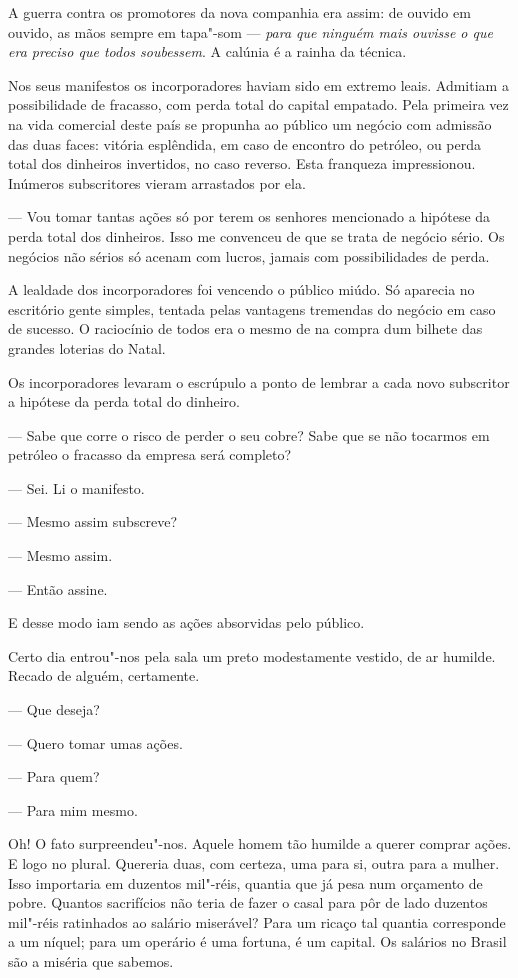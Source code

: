 A guerra contra os promotores da nova companhia era assim: de ouvido em
ouvido, as mãos sempre em tapa"-som --- \emph{para que ninguém mais
ouvisse o que era preciso que todos soubessem}. A calúnia é a rainha da
técnica.

Nos seus manifestos os incorporadores haviam sido em extremo leais.
Admitiam a possibilidade de fracasso, com perda total do capital
empatado. Pela primeira vez na vida comercial deste país se propunha ao
público um negócio com admissão das duas faces: vitória esplêndida, em
caso de encontro do petróleo, ou perda total dos dinheiros invertidos,
no caso reverso. Esta franqueza impressionou. Inúmeros subscritores
vieram arrastados por ela.

--- Vou tomar tantas ações só por terem os senhores mencionado a
hipótese da perda total dos dinheiros. Isso me convenceu de que se trata
de negócio sério. Os negócios não sérios só acenam com lucros, jamais
com possibilidades de perda.

A lealdade dos incorporadores foi vencendo o público miúdo. Só aparecia
no escritório gente simples, tentada pelas vantagens tremendas do
negócio em caso de sucesso. O raciocínio de todos era o mesmo de na
compra dum bilhete das grandes loterias do Natal.

Os incorporadores levaram o escrúpulo a ponto de lembrar a cada novo
subscritor a hipótese da perda total do dinheiro.

--- Sabe que corre o risco de perder o seu cobre? Sabe que se não
tocarmos em petróleo o fracasso da empresa será completo?

--- Sei. Li o manifesto.

--- Mesmo assim subscreve?

--- Mesmo assim.

--- Então assine.

E desse modo iam sendo as ações absorvidas pelo público.

Certo dia entrou"-nos pela sala um preto modestamente vestido, de ar
humilde. Recado de alguém, certamente.

--- Que deseja?

--- Quero tomar umas ações.

--- Para quem?

--- Para mim mesmo.

Oh! O fato surpreendeu"-nos. Aquele homem tão humilde a querer comprar
ações. E logo no plural. Quereria duas, com certeza, uma para si, outra
para a mulher. Isso importaria em duzentos mil"-réis, quantia que já pesa
num orçamento de pobre. Quantos sacrifícios não teria de fazer o casal
para pôr de lado duzentos mil"-réis ratinhados ao salário miserável? Para
um ricaço tal quantia corresponde a um níquel; para um operário é uma
fortuna, é um capital. Os salários no Brasil são a miséria que sabemos.

